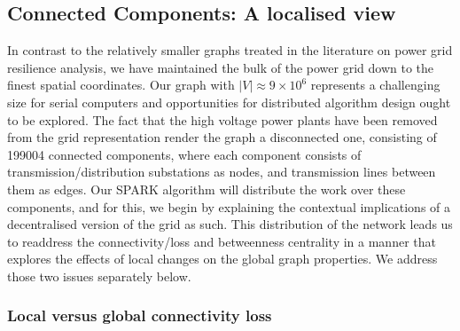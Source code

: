 \subsection{Connected Components: A localised view}



In contrast to the relatively smaller graphs treated in the literature on power grid resilience analysis, we have maintained the bulk of the power grid down to the finest spatial coordinates. Our graph with $\left \vert V \right \vert \approx 9 \times 10^6 $ represents a challenging size for serial computers and opportunities for distributed algorithm design ought to be explored. The fact that the high voltage power plants have been removed from the grid representation render the graph a disconnected one, consisting of 199004 connected components, where each component consists of transmission/distribution substations as nodes, and transmission lines between them as edges. Our SPARK algorithm will distribute the work over these components, and for this, we begin by explaining the contextual implications of a decentralised version of the grid as such. This distribution of the network leads us to readdress the connectivity/loss and betweenness centrality in a manner that explores the effects of local changes on the global graph properties. We address those two issues separately below.

\subsubsection{Local versus global connectivity loss}

